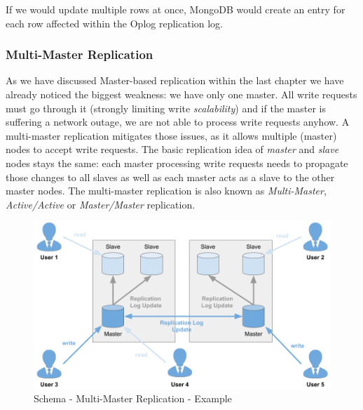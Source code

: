 {If we would update multiple rows at once, MongoDB would create an entry for each row affected within the Oplog replication log.

\newpage
\subsubsection{Multi-Master Replication}
\label{tf_dds_replication_multi_master}
As we have discussed Master-based replication within the last chapter we have already noticed the biggest weakness: we have only one master. All write requests must go through it (strongly limiting write \textit{scalability}) and if the master is suffering a network outage, we are not able to process write requests anyhow. A multi-master replication  mitigates those issues, as it allows multiple (master) nodes to accept write requests. The basic replication idea of \textit{master} and \textit{slave} nodes stays the same: each master processing write requests needs to propagate those changes to all slaves as well as each master acts as a slave to the other master nodes. The multi-master replication is also known as \textit{Multi-Master}, \textit{Active/Active} or \textit{Master/Master} replication.

\begin{figure}[h]
	\centering
  \includegraphics[width=1\textwidth]{replication_schema_ml_replication.png}
	\caption{Schema - Multi-Master Replication - Example}
	\label{schema_replication_ml_replication}
\end{figure}

}
